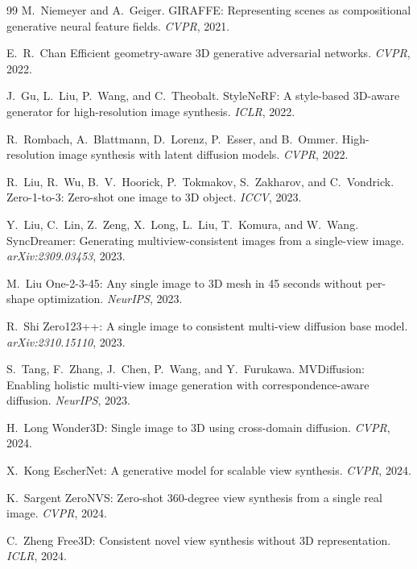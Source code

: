 \begin{thebibliography}{99}
M.~Niemeyer and A.~Geiger.
GIRAFFE: Representing scenes as compositional generative neural feature fields.
\emph{CVPR}, 2021.


E.~R.~Chan \etal
Efficient geometry-aware 3D generative adversarial networks.
\emph{CVPR}, 2022.


J.~Gu, L.~Liu, P.~Wang, and C.~Theobalt.
StyleNeRF: A style-based 3D-aware generator for high-resolution image synthesis.
\emph{ICLR}, 2022.


R.~Rombach, A.~Blattmann, D.~Lorenz, P.~Esser, and B.~Ommer.
High-resolution image synthesis with latent diffusion models.
\emph{CVPR}, 2022.


R.~Liu, R.~Wu, B.~V.~Hoorick, P.~Tokmakov, S.~Zakharov, and C.~Vondrick.
Zero-1-to-3: Zero-shot one image to 3D object.
\emph{ICCV}, 2023.


Y.~Liu, C.~Lin, Z.~Zeng, X.~Long, L.~Liu, T.~Komura, and W.~Wang.
SyncDreamer: Generating multiview-consistent images from a single-view image.
\emph{arXiv:2309.03453}, 2023.


M.~Liu \etal
One-2-3-45: Any single image to 3D mesh in 45 seconds without per-shape
optimization.
\emph{NeurIPS}, 2023.


R.~Shi \etal
Zero123++: A single image to consistent multi-view diffusion base model.
\emph{arXiv:2310.15110}, 2023.


S.~Tang, F.~Zhang, J.~Chen, P.~Wang, and Y.~Furukawa.
MVDiffusion: Enabling holistic multi-view image generation with correspondence-aware diffusion.
\emph{NeurIPS}, 2023.


H.~Long \etal
Wonder3D: Single image to 3D using cross-domain diffusion.
\emph{CVPR}, 2024.


X.~Kong \etal
EscherNet: A generative model for scalable view synthesis.
\emph{CVPR}, 2024.


K.~Sargent \etal
ZeroNVS: Zero-shot 360-degree view synthesis from a single real image.
\emph{CVPR}, 2024.


C.~Zheng \etal
Free3D: Consistent novel view synthesis without 3D representation.
\emph{ICLR}, 2024.



\end{thebibliography}
